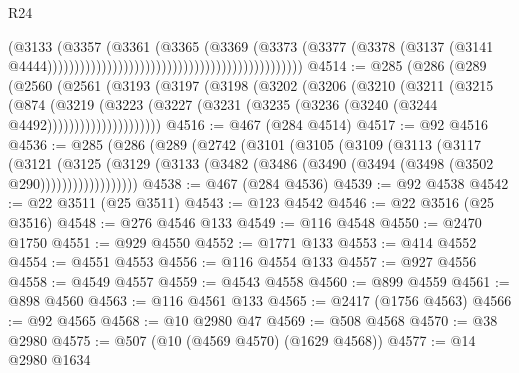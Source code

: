 \begin{lexlean}{R24}
\begin{coremodule}
                                                                              (@3133
                                                                                (@3357
                                                                                  (@3361
                                                                                    (@3365
                                                                                      (@3369
                                                                                        (@3373
                                                                                          (@3377
                                                                                            (@3378
                                                                                              (@3137
                                                                                                (@3141
                                                                                                  @4444)))))))))))))))))))))))))))))))))))))))))))))))
@4514 := @285
    (@286
      (@289
        (@2560
          (@2561
            (@3193
              (@3197
                (@3198
                  (@3202
                    (@3206
                      (@3210
                        (@3211
                          (@3215
                            (@874
                              (@3219
                                (@3223
                                  (@3227
                                    (@3231 (@3235 (@3236 (@3240 (@3244 @4492)))))))))))))))))))))
@4516 := @467 (@284 @4514)
@4517 := @92 @4516
@4536 := @285
    (@286
      (@289
        (@2742
          (@3101
            (@3105
              (@3109
                (@3113
                  (@3117
                    (@3121
                      (@3125
                        (@3129
                          (@3133 (@3482 (@3486 (@3490 (@3494 (@3498 (@3502 @290))))))))))))))))))
@4538 := @467 (@284 @4536)
@4539 := @92 @4538
@4542 := @22 @3511 (@25 @3511)
@4543 := @123 @4542
@4546 := @22 @3516 (@25 @3516)
@4548 := @276 @4546 @133
@4549 := @116 @4548
@4550 := @2470 @1750
@4551 := @929 @4550
@4552 := @1771 @133
@4553 := @414 @4552
@4554 := @4551 @4553
@4556 := @116 @4554 @133
@4557 := @927 @4556
@4558 := @4549 @4557
@4559 := @4543 @4558
@4560 := @899 @4559
@4561 := @898 @4560
@4563 := @116 @4561 @133
@4565 := @2417 (@1756 @4563)
@4566 := @92 @4565
@4568 := @10 @2980 @47
@4569 := @508 @4568
@4570 := @38 @2980
@4575 := @507 (@10 (@4569 @4570) (@1629 @4568))
@4577 := @14 @2980 @1634

\end{coremodule}
\end{lexlean}
